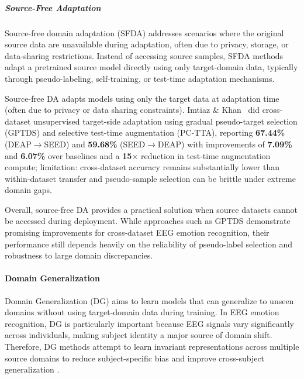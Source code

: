 \documentclass{WileyMSP-template}
\begin{document}
\subparagraph{Source-Free Adaptation}
Source-free domain adaptation (SFDA) addresses scenarios where the original source data are unavailable during adaptation, often due to privacy, storage, or data-sharing restrictions. Instead of accessing source samples, SFDA methods adapt a pretrained source model directly using only target-domain data, typically through pseudo-labeling, self-training, or test-time adaptation mechanisms.

Source-free DA adapts models using only the target data at adaptation time (often due to privacy or data sharing constraints). Imtiaz \& Khan~\cite{imtiaz2025compbiomed_uda_gptds} did cross-dataset unsupervised target-side adaptation using gradual pseudo-target selection (GPTDS) and selective test-time augmentation (PC-TTA), reporting \textbf{67.44\%} (DEAP$\rightarrow$SEED) and \textbf{59.68\%} (SEED$\rightarrow$DEAP) with improvements of \textbf{7.09\%} and \textbf{6.07\%} over baselines and a \textbf{15$\times$} reduction in test-time augmentation compute; limitation: cross-dataset accuracy remains substantially lower than within-dataset transfer and pseudo-sample selection can be brittle under extreme domain gaps.

Overall, source-free DA provides a practical solution when source datasets cannot be accessed during deployment. While approaches such as GPTDS demonstrate promising improvements for cross-dataset EEG emotion recognition, their performance still depends heavily on the reliability of pseudo-label selection and robustness to large domain discrepancies.

\paragraph{Domain Generalization}
Domain Generalization (DG) aims to learn models that can generalize to unseen domains without using target-domain data during training. In EEG emotion recognition, DG is particularly important because EEG signals vary significantly across individuals, making subject identity a major source of domain shift. Therefore, DG methods attempt to learn invariant representations across multiple source domains to reduce subject-specific bias and improve cross-subject generalization \cite{zhou2022dgsurvey,apicella2024neucom_systematic}.
\end{document}
